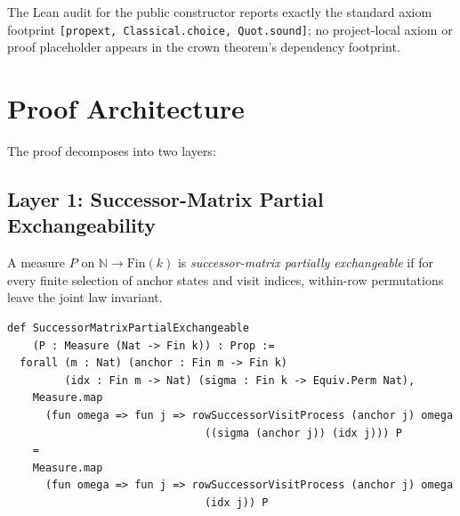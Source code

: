 \documentclass[11pt,a4paper]{article}
\theoremstyle{definition}
\begin{document}
The Lean audit for the public constructor reports exactly the standard axiom
footprint \texttt{[propext, Classical.choice, Quot.sound]}; no project-local
axiom or proof placeholder appears in the crown theorem's dependency
footprint.

\section{Proof Architecture}

The proof decomposes into two layers:

\begin{center}
\end{center}

\subsection{Layer 1: Successor-Matrix Partial Exchangeability}

A measure $P$ on $\mathbb{N} \to \mathrm{Fin}(k)$ is \emph{successor-matrix
partially exchangeable} if for every finite selection of anchor states and
visit indices, within-row permutations leave the joint law invariant.

\begin{lstlisting}
def SuccessorMatrixPartialExchangeable
    (P : Measure (Nat -> Fin k)) : Prop :=
  forall (m : Nat) (anchor : Fin m -> Fin k)
         (idx : Fin m -> Nat) (sigma : Fin k -> Equiv.Perm Nat),
    Measure.map
      (fun omega => fun j => rowSuccessorVisitProcess (anchor j) omega
                               ((sigma (anchor j)) (idx j))) P
    =
    Measure.map
      (fun omega => fun j => rowSuccessorVisitProcess (anchor j) omega
                               (idx j)) P
\end{lstlisting}
\end{document}
